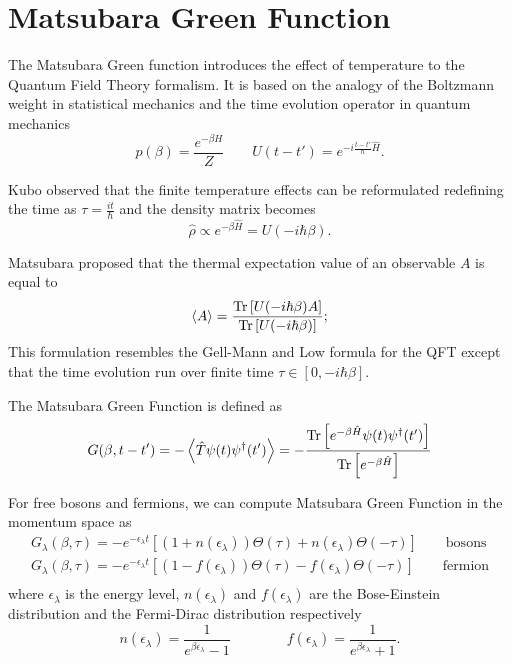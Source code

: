 \chapter{Matsubara Green Function} \label{Appendix_B}

The Matsubara Green function introduces the effect of temperature to the Quantum Field Theory formalism.
It is based on the analogy of the Boltzmann weight in statistical mechanics and the time evolution operator in quantum mechanics 
\begin{equation}
    p(\beta) = \frac{e^{-\beta H}}{Z} \qquad U(t-t') = e^{-i\frac{t-t'}{\hbar}\hat H} .
\end{equation}

Kubo observed that the finite temperature effects can be reformulated redefining the time as $\tau = \frac{it}{\hbar}$ and the density matrix becomes \cite{Coleman_2015}
\begin{equation}
    \hat \rho \propto e^{-\beta \hat H} = U(-i\hbar \beta).
\end{equation}

Matsubara proposed that the thermal expectation value of an observable $A$ is equal to  \cite{Coleman_2015}
\begin{equation}
    \left<A\right> = \frac{\operatorname{Tr} \left[U(-i\hbar \beta)A\right]}{\operatorname{Tr}\left[U(-i\hbar \beta)\right]};
\end{equation}
This formulation resembles the Gell-Mann and Low formula for the QFT except that the time evolution run over finite time $\tau \in \left[0,-i\hbar\beta\right]$.

The Matsubara Green Function is defined as 
\begin{equation}
    G(\beta, t-t') = - \left< \hat T \psi(t)\psi^\dagger(t') \right> = -\frac{\operatorname{Tr}\left[e^{-\beta\hat H} \psi(t)\psi^\dagger(t') \right]}{\operatorname{Tr}\left[e^{-\beta\hat H}\right]}
\end{equation}

For free bosons and fermions, we can compute Matsubara Green Function in the momentum space as \cite{Coleman_2015}
\begin{equation}
    \begin{split}
        G_{\lambda}(\beta, \tau) = -e^{-\epsilon_\lambda t}\left[(1+n(\epsilon_\lambda))\Theta(\tau)+n(\epsilon_\lambda)\Theta(-\tau)\right] \qquad \mathrm{bosons}\\
        G_{\lambda}(\beta, \tau) = -e^{-\epsilon_\lambda t}\left[(1-f(\epsilon_\lambda))\Theta(\tau)-f(\epsilon_\lambda)\Theta(-\tau)\right] \qquad \mathrm{fermion}\\
    \end{split}
\end{equation}
where $\epsilon_\lambda$ is the energy level, $n(\epsilon_\lambda)$ and $f(\epsilon_\lambda)$ are the Bose-Einstein distribution and the Fermi-Dirac distribution respectively
\begin{equation}
    n(\epsilon_\lambda) = \frac{1}{e^{\beta\epsilon_\lambda} - 1} \qquad\qquad f(\epsilon_\lambda) = \frac{1}{e^{\beta\epsilon_\lambda} + 1}.
\end{equation}

